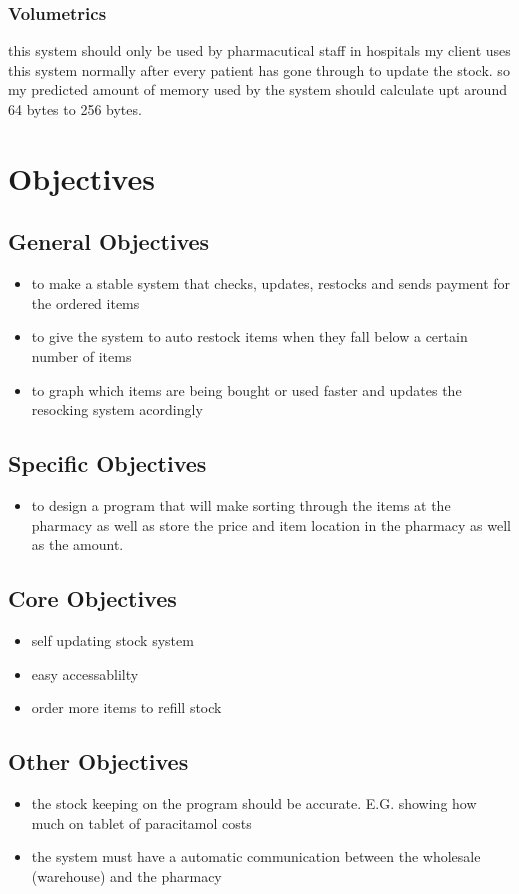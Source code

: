 \subsubsection{Volumetrics}
this system should only be used by pharmacutical staff in hospitals my client uses this system normally after every patient has gone through to update the stock. so my predicted amount of memory used by the system should calculate upt around 64 bytes to 256 bytes.
\section{Objectives}
\subsection{General Objectives}
\begin{itemize}
	\item to make a stable system that checks, updates, restocks and sends payment for the ordered items
	\item to give the system to auto restock items when they fall below a certain number of items
	\item to graph which items are being bought or used faster and updates the resocking system acordingly 
\end{itemize}
\subsection{Specific Objectives}
\begin{itemize}
	\item to design a program that will make sorting through the items at the pharmacy as well as store the price and item location in the pharmacy as well as the amount.
\end{itemize}
\subsection{Core Objectives}
\begin{itemize}
\item self updating stock system
\item easy accessablilty
\item order more items to refill stock
\end{itemize}
\subsection{Other Objectives}
\begin{itemize}
    \item the stock keeping on the program should be accurate. E.G. showing how much on tablet of paracitamol costs
    \item the system must have a automatic communication between the wholesale (warehouse) and the pharmacy
\end{itemize}
